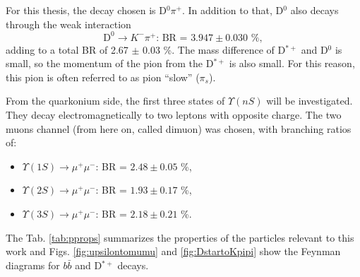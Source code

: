 For this thesis, the decay chosen is D$^0 \pi^+$. In addition to that, D$^0$ also decays through the weak interaction
\begin{equation*}
    \text{D}^0 \rightarrow K^- \pi^+\text{: BR = } 3.947\pm0.030\text{ \%},
\end{equation*}
adding to a total BR of 2.67 $\pm$ 0.03 \%. The mass difference of D$^{*+}$ and D$^0$ is small, so the momentum of the pion from the D$^{*+}$ is also small. For this reason, this pion is often referred to as pion ``slow'' ($\pi_s$).

From the quarkonium side, the first three states of $\Upsilon(nS)$ will be investigated. They decay electromagnetically to two leptons with opposite charge. The two muons channel (from here on, called dimuon) was chosen, with branching ratios of:
\begin{itemize}
    \item $\Upsilon(1S) \rightarrow \mu^+ \mu^-$: BR = $2.48 \pm 0.05$ \%,
    \item $\Upsilon(2S) \rightarrow \mu^+ \mu^-$: BR = $1.93 \pm 0.17$ \%,
    \item $\Upsilon(3S) \rightarrow \mu^+ \mu^-$: BR = $2.18 \pm 0.21$ \%.
\end{itemize}
The Tab. \ref{tab:pprops} summarizes the properties of the particles relevant to this work and Figs. \ref{fig:upsilontomumu} and \ref{fig:DstartoKpipi} show the Feynman diagrams for $b\bar b$ and D$^{*+}$ decays.

